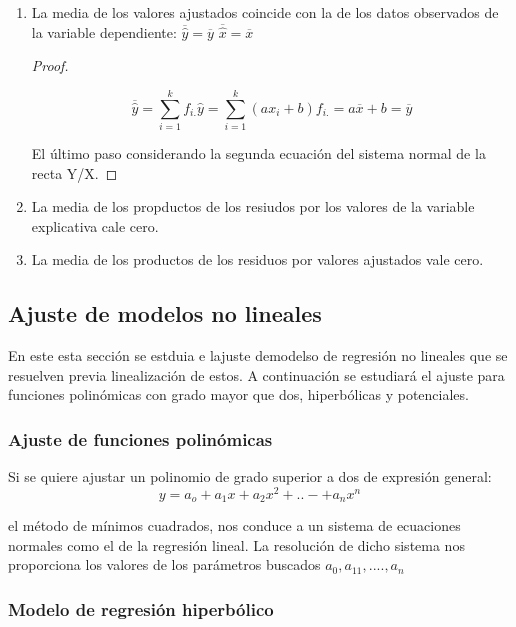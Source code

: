 \documentclass{article}
\begin{document}
\begin{enumerate}
\begin{proof}
	El último paso se hace considerando la segunda ecuación del sistema normal de recta de Y/X la cual es la siguiente:
	$$ \overline{y} = a\overline{x} + b $$
\end{proof}

\item La media de los valores ajustados coincide con la de los datos observados de la variable dependiente: $\overline{\hat{y}} = \overline{y} $ $\overline{\hat{x}} = \overline{x}$

\begin{proof}
$ $\newline

$$ \overline{\hat{y}} = \sum_{i=1}^kf_{i.} \hat{y}  = \sum_{i=1}^k(ax_i +b)f_{i.} = a\overline{x} +b = \overline{y} $$

El último paso considerando la segunda ecuación del sistema normal de la recta Y/X.
\end{proof}
\item La media de los propductos de los resiudos por los valores de la variable explicativa cale cero.
\item La media de los productos de los residuos por valores ajustados vale cero.

\end{enumerate}

\subsection{Ajuste de modelos no lineales}

En este esta sección se estduia e lajuste demodelso de regresión no lineales que se resuelven previa linealización de estos. A continuación se estudiará el ajuste para funciones polinómicas con grado mayor que dos, hiperbólicas y potenciales.

\subsubsection{Ajuste de funciones polinómicas}

Si se quiere ajustar un polinomio de grado superior a dos de expresión general:
$$ y = a_o + a_1x +a_2x^2 + ..- + a_nx^n $$

el método de mínimos cuadrados, nos conduce a un sistema de ecuaciones normales como el de la regresión lineal. La resolución de dicho sistema nos proporciona los valores de los parámetros buscados $a_0, a_11, .... , a_n$
\subsubsection{Modelo de regresión hiperbólico}
\end{document}
